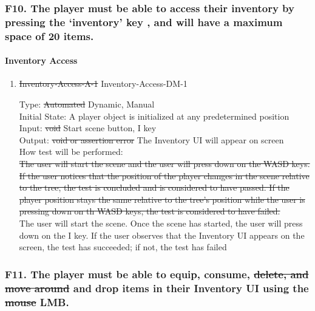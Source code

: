 \documentclass[12pt, titlepage]{article}
\DeclareRobustCommand{\hsout}[1]{\texorpdfstring{\sout{#1}}{#1}}
\newcounter{ftnum}
\begin{document}
\subsubsection{{\color{magenta} F10.} The player must be able to access their inventory by pressing the ‘inventory’ key{\color{magenta} , and will have a maximum space of 20 items.}} 

\paragraph{Inventory Access}

\begin{enumerate}

\item{\sout{Inventory-Access-A-1} {\color{magenta} Inventory-Access-DM-1}\\}  \label{F10-1}

Type: \sout{Automated} {\color{magenta} Dynamic, Manual}\\
					
Initial State: A player object is initialized at any predetermined position\\
					
Input: \sout{void} {\color{magenta} Start scene button, I key}\\
					
Output: \sout{void or assertion error} {\color{magenta} The Inventory UI will appear on screen}\\
					
How test will be performed:\\ \sout{The user will start the scene and the user will press down on the WASD keys. If the user notices that the position of the player changes in the scene relative to the tree, the test is concluded and is considered to have passed. If the player position stays the same relative to the tree's position while the user is pressing down on th WASD keys, the test is considered to have failed.} \\
{\color{magenta} The user will start the scene. Once the scene has started, the user will press down on the I key. If the user observes that the Inventory UI appears on the screen, the test has succeeded; if not, the test has failed}\\

\end{enumerate}

\subsubsection{{\color{magenta} F11.} The player must be able to equip, consume, \hsout{delete, and move around} {\color{magenta} and drop} items in their Inventory {\color{magenta} UI} using the \hsout{mouse} {\color{magenta} LMB.}} 
\end{document}
